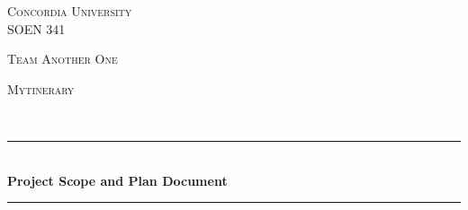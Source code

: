 \documentclass[12pt]{article}
\begin{document}
\begin{titlepage}

\newcommand{\HRule}{\rule{\linewidth}{0.5mm}} %

\center %
 

\textsc{\LARGE Concordia University}\\[1cm] %
\textsc{\Large SOEN 341}\\[1cm] %
\begin{flushleft} 
\end{flushleft}
\begin{minipage}{0.45\textwidth}
\begin{flushleft} \large
\textsc{\large Team Another One }
\end{flushleft}
\end{minipage}
\begin{minipage}{0.45\textwidth}
\begin{flushright} \large
\textsc{\large Mytinerary}
\end{flushright}
\end{minipage}\\[0.5cm]


\HRule \\[0.4cm]
{ \huge \bfseries Project Scope and Plan Document}\\[0.4cm] %
\HRule \\[1cm]
 

\end{titlepage}
\end{document}
